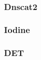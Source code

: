 \documentclass [11pt, proquest] {uwthesis}[2020/02/24]
\begin{document}
\subsubsection{Dnscat2}


\subsubsection{Iodine}


\subsubsection{DET}







\end{document}
